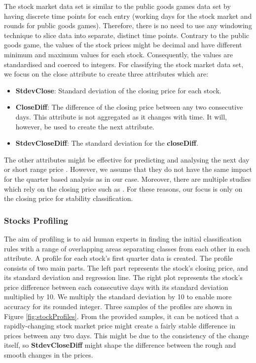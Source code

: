 The stock market data set is similar to the public goods games data set by having discrete time points for each entry (working days for the stock market and rounds for public goods games). Therefore, there is no need to use any windowing technique to slice data into separate, distinct time points. Contrary to the public goods game, the values of the stock prices might be decimal and have different minimum and maximum values for each stock. Consequently, the values are standardised and coerced to integers. For classifying the stock market data set, we focus on the close attribute to create three attributes which are:


\begin{itemize}
    \item \textbf{StdevClose}: Standard deviation of the closing price for each stock.
    
    \item \textbf{CloseDiff}: The difference of the closing price between any two consecutive days. This attribute is not aggregated as it changes with time. It will, however, be used to create the next attribute.
    
    \item \textbf{StdevCloseDiff}: The standard deviation for the \textbf{closeDiff}.
    
\end{itemize}

The other attributes might be effective for predicting and analysing the next day or short range price \cite{Larsen2010}. However, we assume that they do not have the same impact for the quarter based analysis as in our case. Moreover, there are multiple studies which rely on the closing price such as \cite{Wolfers2004}. For these reasons, our focus is only on the closing price for stability classification.



\subsubsection{Stocks Profiling}

The aim of profiling is to aid human experts in finding the initial classification rules with a range of overlapping areas separating classes from each other in each attribute. A profile for each stock's first quarter data is created. The profile consists of two main parts. The left part represents the stock's closing price, and its standard deviation and regression line. The right plot represents the stock's price difference between each consecutive days with its standard deviation multiplied by 10. We multiply the standard deviation by 10 to enable more accuracy for its rounded integer. Three samples of the profiles are shown in Figure  \ref{fig:stockProfiles}. From the provided samples, it can be noticed that a rapidly-changing stock market price might create a fairly stable difference in prices between any two days. This might be due to the consistency of the change itself, so \textbf{StdevCloseDiff} might shape the difference between the rough and smooth changes in the prices.


